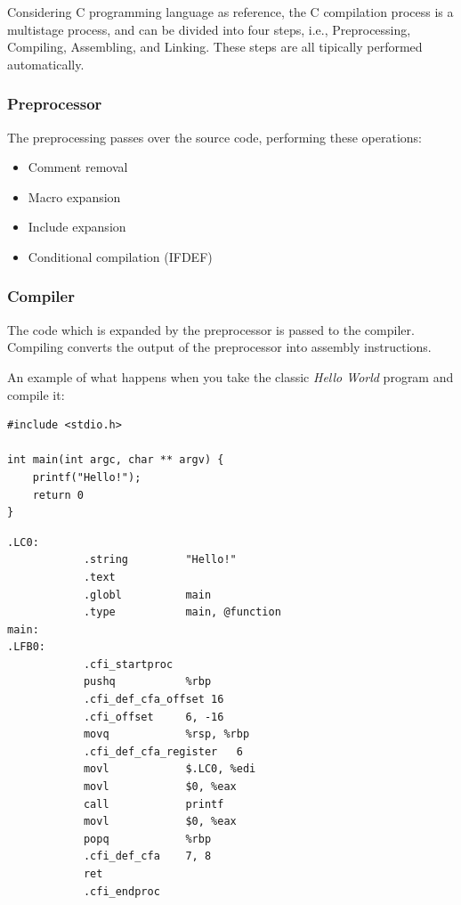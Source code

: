 \documentclass{article}
\begin{document}
Considering C programming language as reference, the C compilation process is a multistage process, and can be 
divided into four steps, i.e., Preprocessing, Compiling, Assembling, and Linking. These steps are all tipically
performed automatically.

\subsubsection{Preprocessor}

The preprocessing passes over the source code, performing these operations:
\begin{itemize}
\item Comment removal
\item Macro expansion
\item Include expansion
\item Conditional compilation (IFDEF)
\end{itemize}

\subsubsection{Compiler}

The code which is expanded by the preprocessor is passed to the compiler. Compiling converts the output of the
preprocessor into assembly instructions.

An example of what happens when you take the classic \textit{Hello World} program and compile it:
\begin{verbatim}
#include <stdio.h>

int main(int argc, char ** argv) {
    printf("Hello!");
    return 0
}
\end{verbatim}
\begin{verbatim}
.LC0:
            .string         "Hello!"
            .text
            .globl          main
            .type           main, @function
main:
.LFB0:
            .cfi_startproc
            pushq           %rbp
            .cfi_def_cfa_offset 16
            .cfi_offset     6, -16
            movq            %rsp, %rbp
            .cfi_def_cfa_register   6
            movl            $.LC0, %edi
            movl            $0, %eax 
            call            printf
            movl            $0, %eax 
            popq            %rbp 
            .cfi_def_cfa    7, 8
            ret 
            .cfi_endproc 
\end{verbatim}
\end{document}
